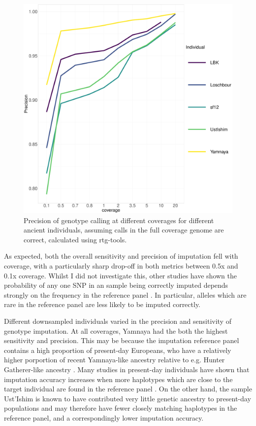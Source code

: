 \begin{figure}[htp]
    \centering
    \includegraphics[width=1.0\textwidth]{../images/chapter1/allDownsampled_rtgtools_Precision.pdf}
    \caption{Precision of genotype calling at different coverages for different ancient individuals, assuming calls in the full coverage genome are correct,  calculated using rtg-tools.}
    \label{fig:precision_downsampled_rtgtools}
\end{figure}

As expected, both the overall sensitivity and precision of imputation fell with coverage, with a particularly sharp drop-off in both metrics between 0.5x and 0.1x coverage. Whilst I did not investigate this, other studies have shown the probability of any one SNP in an sample being correctly imputed depends strongly on the frequency in the reference panel \cite{hui2020evaluating, rubinacci2021efficient}. In particular, alleles which are rare in the reference panel are less likely to be imputed correctly.

Different downsampled individuals varied in the precision and sensitivity of genotype imputation. At all coverages, Yamnaya had the both the highest sensitivity and precision. This may be because the imputation reference panel contains a high proportion of present-day Europeans, who have a relatively higher porportion of recent Yamnaya-like ancestry relative to e.g. Hunter Gatherer-like ancestry \cite{Haak2005}. Many studies in present-day individuals have shown that imputation accuracy increases when more haplotypes which are close to the target individual are found in the reference panel \cite{HUANG2009235, delaneau2018integrative}. On the other hand, the sample Ust'Ishim is known to have contributed very little genetic ancestry to present-day populations \cite{Prufer2014} and may therefore have fewer closely matching haplotypes in the reference panel, and a correspondingly lower imputation accuracy. 

